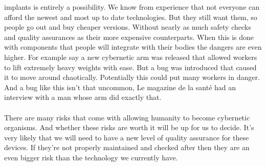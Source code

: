 \documentclass[12pt,a4paper,notitlepage]{article}
\begin{document}
implants is entirely a possibility. We know from experience that not everyone
can afford the newest and most up to date technologies. But they still want
them, so people go out and buy cheaper versions. Without nearly as much safety
checks and quality assurances as their more expensive counterparts. When this is
done with components that people will integrate with their bodies the dangers
are even higher. For example say a new cybernetic arm was released that allowed
workers to lift extremely heavy weights with ease. But a bug was introduced that
caused it to move around chaotically. Potentially this could put many workers in
danger. And a bug like this isn't that uncommon, Le magazine de la sant\'{e} had
an interview with a man whose arm did exactly that. 
\\\\
There are many risks that come with allowing humanity to become cybernetic
organisms. And whether these risks are worth it will be up for us to decide.
It's very likely that we will need to have a new level of quality assurance for
these devices. If they're not properly maintained and checked after then they
are an even bigger risk than the technology we currently have.
\\
\end{document}
